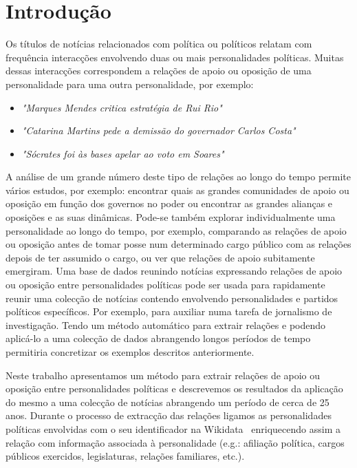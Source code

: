 \documentclass[a4paper, twocolumn, 11pt, twoside]{article}
\begin{document}

\section{Introdução}
\label{sec:intro}

Os títulos de notícias relacionados com política ou políticos relatam com frequência interacções envolvendo duas ou mais personalidades políticas. Muitas dessas interacções correspondem a relações de apoio ou oposição de uma personalidade para uma outra personalidade, por exemplo:

\begin{itemize}
\item{\textit{"Marques Mendes critica estratégia de Rui Rio"}}
\item{\textit{"Catarina Martins pede a demissão do governador Carlos Costa"}}
\item{\textit{"Sócrates foi às bases apelar ao voto em Soares"}}
\end{itemize}

A análise de um grande número deste tipo de relações ao longo do tempo permite vários estudos, por exemplo: encontrar quais as grandes comunidades de apoio ou oposição em função dos governos no poder ou encontrar as grandes alianças e oposições e as suas dinâmicas. Pode-se também explorar individualmente uma personalidade ao longo do tempo, por exemplo, comparando as relações de apoio ou oposição antes de tomar posse num determinado cargo público com as relações depois de ter assumido o cargo, ou ver que relações de apoio subitamente emergiram. Uma base de dados reunindo notícias expressando relações de apoio ou oposição entre personalidades políticas pode ser usada para rapidamente reunir uma colecção de notícias contendo envolvendo personalidades e partidos políticos específicos. Por exemplo, para auxiliar numa tarefa de jornalismo de investigação. Tendo um método automático para extrair relações e podendo aplicá-lo a uma colecção de dados abrangendo longos períodos de tempo permitiria concretizar os exemplos descritos anteriormente.

Neste trabalho apresentamos um método para extrair relações de apoio ou oposição entre personalidades políticas e descrevemos os resultados da aplicação do mesmo a uma colecção de notícias abrangendo um período de cerca de 25 anos. Durante o processo de extracção das relações ligamos as personalidades políticas envolvidas com o seu identificador na Wikidata~\citep{MKGGB2018} enriquecendo assim a relação com informação associada à personalidade (e.g.: afiliação política, cargos públicos exercidos, legislaturas, relações familiares, etc.). 
\end{document}
